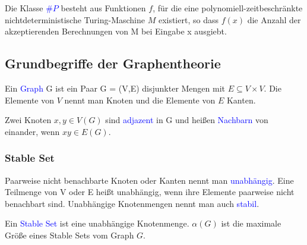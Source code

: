 \begin{definition}
Die Klasse \textcolor{blue}{$\#P$} besteht aus Funktionen $f$, für die eine polynomiell-zeitbeschränkte nichtdeterministische Turing-Maschine $M$ existiert, so dass $f(x)$ die Anzahl der akzeptierenden Berechnungen von M bei Eingabe x ausgiebt. \citep{Kompl2}
\end{definition}


\subsection{Grundbegriffe der Graphentheorie} 

\begin{definition}
Ein \textcolor{blue}{Graph} G ist ein Paar G = (V,E) disjunkter Mengen mit $E \subseteq V\times V$. Die Elemente von $V$ nennt man Knoten und die Elemente von $E$ Kanten. \cite{Diestel}
\end{definition}

\begin{definition}
Zwei Knoten $x,y \in V(G)$ sind \textcolor{blue}{adjazent} in G und heißen \textcolor{blue}{Nachbarn} von einander, wenn $xy \in E(G)$. \cite{Diestel}
\end{definition}

\subsubsection*{Stable Set}

\begin{definition}
Paarweise nicht benachbarte Knoten oder Kanten nennt man \textcolor{blue}{unabhängig}. Eine Teilmenge von V oder E heißt unabhängig, wenn ihre Elemente paarweise nicht benachbart sind. Unabhängige Knotenmengen nennt man auch \textcolor{blue}{stabil}. \cite{Diestel}
\end{definition}

\begin{definition}
Ein \textcolor{blue}{Stable Set} ist eine unabhängige Knotenmenge. $\alpha (G)$ ist die maximale Größe eines Stable Sets vom Graph $G$.
\end{definition}


